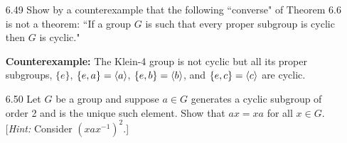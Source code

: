 \begin{enumerate}
      \textbf{Case 2:} \textit{Every element in $G$ has finite order.} We wish
      to construct a sequence of elements $x_1$, $x_2$, $x_3$, $\ldots$, in $G$ 
      such that each of these elements generates a unique subgroup in $G$. So
      let $x_1 = e$. For an integer $n \ge 2$, let $P(n)$ be the statement that 
      we can choose an element $x_n \in G$ such that for all $1 \le i < n$,
      $x_n \notin \cyc{x_i}$, so that $\cyc{x_n} \neq \cyc{x_i}$. We shall 
      proceed by induction on $n$. Since $G$ is infinite, and since $\cyc{e}$ is
      finite, it follows that $G{\backslash}\cyc{e}$ is infinite. So pick any
      element in $G{\backslash}\cyc{e}$ and denote it $x_2$. It is clear that
      $x_2 \notin \{e\}$, so that $P(2)$ is true. Now suppose that $P(m)$ holds
      for some positive integer $m$. Since every element of $G$ has finite
      order, it follows that every cyclic group generated by every element of
      $G$ is also finite. Thus the set $\bigcup_{k=1}^{m-1}\cyc{x_k}$ is finite,
      so that $G{\backslash}\bigcup_{k=1}^{m-1}\cyc{x_k}$ is infinite. So pick
      any element of $G{\backslash}\bigcup_{k=1}^{m-1}\cyc{x_k}$ and call it
      $x_{k + 1}$. By construction we see that $x_{k + 1} \notin \cyc{x_i}$ for
      all $1 \le i \le k$. Thus $P(n)$ holds for all $n$. Thus for each positive
      integer $n$, $G$ has a subgroup $\cyc{x_n}$, and
      $\cyc{x_i} \neq \cyc{x_j}$ for any positive integers $i \neq j$. Hence $G$ 
      has an infinite number of subgroups. \qed      
   \item[6.49] Show by a counterexample that the following ``converse" of
               Theorem 6.6 is not a theorem: ``If a group $G$ is such that
               every proper subgroup is cyclic then $G$ is cyclic."

      \textbf{Counterexample:} The Klein-4 group is not cyclic but all its
      proper subgroups, $\{e\}$, $\{e, a\} = \langle a \rangle$, $\{e, b\} = \langle b \rangle$, 
      and $\{e, c\} = \langle c \rangle$ are cyclic.
   \item[6.50] Let $G$ be a group and suppose $a \in G$ generates a cyclic
               subgroup of order 2 and is the unique such element. Show that
               $ax = xa$ for all $x \in G$.
               [\textit{Hint:} Consider $(xax^{-1})^2$.]


\end{enumerate}
